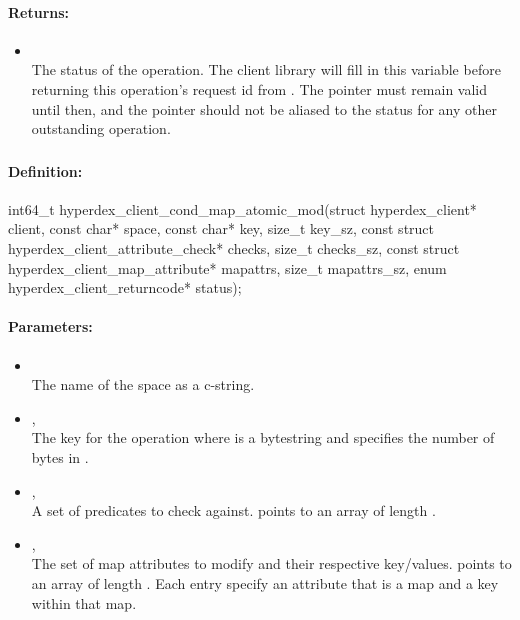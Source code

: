 \paragraph{Returns:}
\begin{itemize}[noitemsep]
\item {}\\
The status of the operation.  The client library will fill in this variable before returning this operation's request id from .  The pointer must remain valid until then, and the pointer should not be aliased to the status for any other outstanding operation.
\end{itemize}

\pagebreak
\subsubsection{}
\label{api:c:cond_map_atomic_mod}


\paragraph{Definition:}
\begin{ccode}
int64_t hyperdex_client_cond_map_atomic_mod(struct hyperdex_client* client,
        const char* space,
        const char* key, size_t key_sz,
        const struct hyperdex_client_attribute_check* checks, size_t checks_sz,
        const struct hyperdex_client_map_attribute* mapattrs, size_t mapattrs_sz,
        enum hyperdex_client_returncode* status);
\end{ccode}

\paragraph{Parameters:}
\begin{itemize}[noitemsep]
\item {}\\
The name of the space as a c-string.
\item {}, \\
The key for the operation where  is a bytestring and  specifies the number of bytes in .
\item {}, \\
A set of predicates to check against.   points to an array of length .
\item {}, \\
The set of map attributes to modify and their respective key/values.   points to an array of length .  Each entry specify an attribute that is a map and a key within that map.
\end{itemize}

